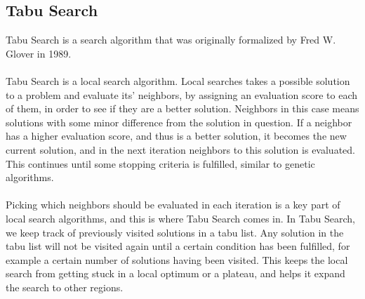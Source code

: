 \documentclass[titlepage,a4paper]{article}
\begin{document}
\subsection{Tabu Search}
Tabu Search is a search algorithm that was originally formalized by Fred W. Glover in 1989\cite{tabuSearch89}. \\\\
Tabu Search is a local search algorithm. Local searches takes a possible solution to a problem and evaluate its’ neighbors, by assigning an evaluation score to each of them, in order to see if they are a better solution. Neighbors in this case means solutions with some minor difference from the solution in question. If a neighbor has a higher evaluation score, and thus is a better solution, it becomes the new current solution, and in the next iteration neighbors to this solution is evaluated. This continues until some stopping criteria is fulfilled, similar to genetic algorithms. \\\\
Picking which neighbors should be evaluated in each iteration is a key part of local search algorithms, and this is where Tabu Search comes in.
In Tabu Search, we keep track of previously visited solutions in a tabu list. Any solution in the tabu list will not be visited again until a certain condition has been fulfilled, for example a certain number of solutions having been visited. This keeps the local search from getting stuck in a local optimum or a plateau, and helps it expand the search to other regions\cite{geneticVS99}. 

\pagebreak
\end{document}
